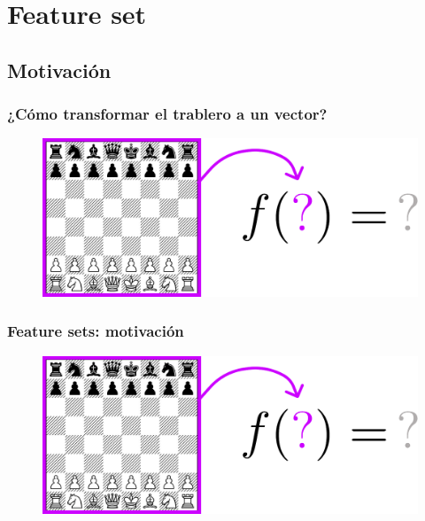 
\section{Feature set}

\subsection{Motivación}

\begin{frame}
\frametitle{¿Cómo transformar el trablero a un vector?}
\begin{figure}
    \centering
    \includegraphics[width=1.0\linewidth]{../assets/slides/fs_motiv.pdf}
\end{figure}
\end{frame}


\begin{frame}
\frametitle{Feature sets: motivación}
\begin{figure}
    \centering
    \includegraphics[width=1.0\linewidth]{../assets/slides/fs_motiv.pdf}
\end{figure}
\end{frame}
